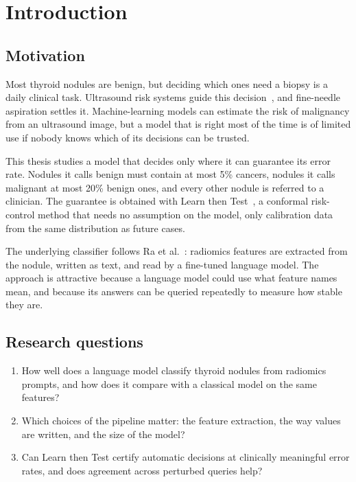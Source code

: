 \chapter{Introduction}
\label{ch:introduction}

\section{Motivation}

Most thyroid nodules are benign, but deciding which ones need a biopsy is a daily clinical task.
Ultrasound risk systems guide this decision~\citep{tessler2017}, and fine-needle aspiration
settles it. Machine-learning models can estimate the risk of malignancy from an ultrasound image,
but a model that is right most of the time is of limited use if nobody knows which of its
decisions can be trusted.

This thesis studies a model that decides only where it can guarantee its error rate. Nodules it
calls benign must contain at most 5\% cancers, nodules it calls malignant at most 20\% benign ones,
and every other nodule is referred to a clinician. The guarantee is obtained with Learn then
Test~\citep{angelopoulos2021ltt}, a conformal risk-control method that needs no assumption on the
model, only calibration data from the same distribution as future cases.

The underlying classifier follows Ra et al.~\citep{ra2025}: radiomics features are extracted from
the nodule, written as text, and read by a fine-tuned language model. The approach is attractive
because a language model could use what feature names mean, and because its answers can be
queried repeatedly to measure how stable they are.

\section{Research questions}

\begin{enumerate}
  \item[RQ1] How well does a language model classify thyroid nodules from radiomics prompts, and
             how does it compare with a classical model on the same features?
  \item[RQ2] Which choices of the pipeline matter: the feature extraction, the way values are
             written, and the size of the model?
  \item[RQ3] Can Learn then Test certify automatic decisions at clinically meaningful error rates,
             and does agreement across perturbed queries help?
\end{enumerate}

